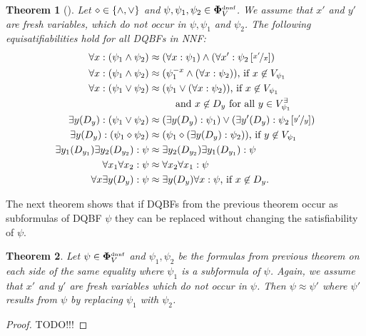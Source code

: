 \documentclass[
  digital, %
  twoside, %
  table,   %
  nolof,     %
  nolot,     %
]{fithesis3}
\let\setbuilder\set
\newcommand{\simpleset}[1]{\{{#1}\}}
\renewcommand{\set}[1]{\normalexpandarg\IfSubStr{#1}{|}{\setbuilder{#1}}{\simpleset{#1}}}
\newtheorem{theorem}{Theorem}[chapter] %
\theoremstyle{definition}
\theoremstyle{remark}
\newcommand{\substitute}[2]{\left[ \nicefrac{#2}{#1} \right]}
\newcommand{\DQBF}[1]{\mathbf{\Phi}_{#1}^{\text{\tiny dnnf}}}
\newcommand{\evars}[1]{V_{#1}^{\exists}}
\begin{document}
\begin{theorem}[{\cite[Theorem 3,4]{HQSquantifierLocalization}}]
  Let ${\diamond} \in \set{{\land},{\lor}}$ and $\psi,\psi_1,\psi_2 \in \DQBF{V}$. We assume that $x'$ and $y'$ are fresh variables, which do not occur in $\psi,\psi_1$ and $\psi_2$. The following equisatifiabilities hold for all DQBFs in NNF:
  \begin{align}
      \forall x : (\psi_1 \land \psi_2) &\approx (\forall x : \psi_1) \land (\forall x' : \psi_2\substitute{x}{x'}) \\
      \forall x : (\psi_1 \land \psi_2) &\approx (\psi_1^{-x} \land (\forall x : \psi_2)) \text{, if } x \not\in V_{\psi_1} \\
      \forall x : (\psi_1 \lor \psi_2) &\approx \begin{multlined}[t][3cm](\psi_1 \lor (\forall x : \psi_2)) \text{, if } x \not\in V_{\psi_1}\\
      \text{ and } x \not\in D_y \text{ for all } y \in \evars{\psi_1}\end{multlined} \\
      \exists y(D_y) : (\psi_1 \lor \psi_2) &\approx (\exists y(D_y) : \psi_1) \lor (\exists y'(D_y) : \psi_2\substitute{y}{y'}) \\
      \exists y(D_y) : (\psi_1 \diamond \psi_2) &\approx (\psi_1 \diamond (\exists y(D_y) : \psi_2)) \text{, if } y \not\in V_{\psi_1} \\
      \exists y_1(D_{y_1})\exists y_2(D_{y_2}) : \psi &\approx \exists y_2(D_{y_2}) \exists y_1(D_{y_1}) : \psi \\
      \forall x_1\forall x_2 : \psi &\approx \forall x_2\forall x_1 : \psi \\
      \forall x\exists y(D_y) : \psi &\approx \exists y(D_y)\forall x : \psi\text{, if } x \not\in D_y.
  \end{align}
\end{theorem}

The next theorem shows that if DQBFs from the previous theorem occur as subformulas of DQBF $\psi$ they can be replaced without changing the satisfiability of $\psi$.

\begin{theorem}
  Let $\psi \in \DQBF{V}$ and $\psi_1, \psi_2$ be the formulas from previous theorem on each side of the same equality where $\psi_1$ is a subformula of $\psi$. Again, we assume that $x'$ and $y'$ are fresh variables which do not occur in $\psi$. Then $\psi \approx \psi'$ where $\psi'$ results from $\psi$ by replacing $\psi_1$ with $\psi_2$.
\end{theorem}
\begin{proof}
  TODO!!!
\end{proof}
\end{document}
